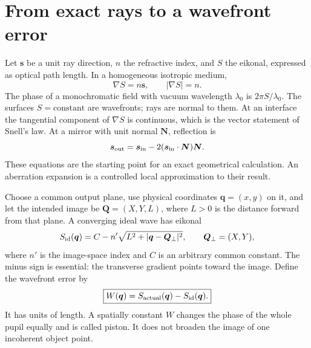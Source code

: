 \section{From exact rays to a wavefront error}
Let $\bm s$ be a unit ray direction, $n$ the refractive index, and $S$ the
eikonal, expressed as optical path length. In a homogeneous isotropic medium,
\begin{equation}
 \nabla S=n\bm s,\qquad |\nabla S|=n.
\end{equation}
The phase of a monochromatic field with vacuum wavelength $\lambda_0$ is
$2\pi S/\lambda_0$. The surfaces $S=\text{constant}$ are wavefronts; rays are
normal to them. At an interface the tangential component of $\nabla S$ is
continuous, which is the vector statement of Snell's law. At a mirror with unit
normal $\bm N$, reflection is
\begin{equation}
 \bm s_{\rm out}=\bm s_{\rm in}
       -2(\bm s_{\rm in}\cdot\bm N)\bm N.
\end{equation}
These equations are the starting point for an exact geometrical calculation.
An aberration expansion is a controlled local approximation to their result.

Choose a common output plane, use physical coordinates $\bm q=(x,y)$ on it,
and let the intended image be $\bm Q=(X,Y,L)$, where $L>0$ is the distance
forward from that plane. A converging ideal wave has eikonal
\begin{equation}
 S_{\rm id}(\bm q)=C-n'\sqrt{L^2+|\bm q-\bm Q_\perp|^2},
 \qquad \bm Q_\perp=(X,Y),
\end{equation}
where $n'$ is the image-space index and $C$ is an arbitrary common constant.
The minus sign is essential: the transverse gradient points toward the image.
Define the wavefront error by
\begin{equation}
 \boxed{W(\bm q)=S_{\rm actual}(\bm q)-S_{\rm id}(\bm q).}
 \label{ab:Wdefinition}
\end{equation}
It has units of length. A spatially constant $W$ changes the phase of the
whole pupil equally and is called piston. It does not broaden the image of
one incoherent object point.

